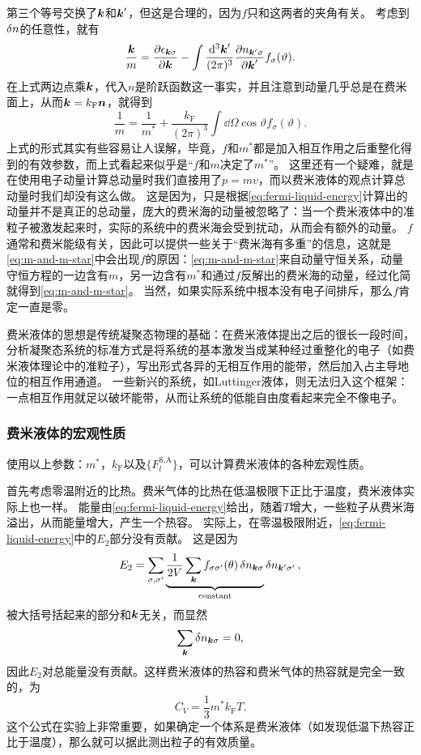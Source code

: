\documentclass[hyperref, UTF8, a4paper]{ctexart}
\begin{document}
第三个等号交换了$\vb*{k}$和$\vb*{k}'$，但这是合理的，因为$f$只和这两者的夹角有关。
考虑到$\var{n}$的任意性，就有
\[
    \frac{\vb*{k}}{m} = \pdv{\epsilon_{\vb*{k} \sigma}}{\vb*{k}} - \int \frac{\dd[3]{\vb*{k}'}}{(2\pi)^3} \pdv{n_{\vb*{k}' \sigma}}{\vb*{k}'} f_{\sigma}(\vartheta).
\]
在上式两边点乘$\vb*{k}$，代入$n$是阶跃函数这一事实，并且注意到动量几乎总是在费米面上，从而$\vb*{k} = k_\text{F} \vb*{n}$，就得到
\begin{equation}
    \frac{1}{m} = \frac{1}{m^*} + \frac{k_\text{F}}{(2\pi)^3} \int \dd{\Omega} \cos \vartheta f_\sigma(\vartheta).
    \label{eq:m-and-m-star}
\end{equation}
上式的形式其实有些容易让人误解，毕竟，$f$和$m^*$都是加入相互作用之后重整化得到的有效参数，而上式看起来似乎是“$f$和$m$决定了$m^*$”。
这里还有一个疑难，就是在使用电子动量计算总动量时我们直接用了$p=mv$，而以费米液体的观点计算总动量时我们却没有这么做。
这是因为，只是根据\eqref{eq:fermi-liquid-energy}计算出的动量并不是真正的总动量，庞大的费米海的动量被忽略了：当一个费米液体中的准粒子被激发起来时，实际的系统中的费米海会受到扰动，从而会有额外的动量。
$f$通常和费米能级有关，因此可以提供一些关于“费米海有多重”的信息，这就是\eqref{eq:m-and-m-star}中会出现$f$的原因：\eqref{eq:m-and-m-star}来自动量守恒关系，动量守恒方程的一边含有$m$，另一边含有$m^*$和通过$f$反解出的费米海的动量，经过化简就得到\eqref{eq:m-and-m-star}。
当然，如果实际系统中根本没有电子间排斥，那么$f$肯定一直是零。

费米液体的思想是传统凝聚态物理的基础：在费米液体提出之后的很长一段时间，分析凝聚态系统的标准方式是将系统的基本激发当成某种经过重整化的电子（如费米液体理论中的准粒子），写出形式各异的无相互作用的能带，然后加入占主导地位的相互作用通道。
一些新兴的系统，如Luttinger液体，则无法归入这个框架：一点相互作用就足以破坏能带，从而让系统的低能自由度看起来完全不像电子。

\subsubsection{费米液体的宏观性质}

使用以上参数：$m^*$，$k_\text{F}$以及$\{F_l^\text{S,A}\}$，可以计算费米液体的各种宏观性质。

首先考虑零温附近的比热。费米气体的比热在低温极限下正比于温度，费米液体实际上也一样。
能量由\eqref{eq:fermi-liquid-energy}给出，随着$T$增大，一些粒子从费米海溢出，从而能量增大，产生一个热容。
实际上，在零温极限附近，\eqref{eq:fermi-liquid-energy}中的$E_2$部分没有贡献。
这是因为
\[
    E_2 = \sum_{\sigma, \sigma'} \underbrace{\frac{1}{2V} \sum_{\vb*{k}} f_{\sigma \sigma'}(\theta) \var{n}_{\vb*{k} \sigma}}_{\text{constant}} \var{n}_{\vb*{k}' \sigma'},
\]
被大括号括起来的部分和$\vb*{k}$无关，而显然
\[
    \sum_{\vb*{k}} \var{n}_{\vb*{k} \sigma} = 0,
\]
因此$E_2$对总能量没有贡献。这样费米液体的热容和费米气体的热容就是完全一致的，为
\begin{equation}
    C_V = \frac{1}{3} m^* k_\text{F} T.
\end{equation}
这个公式在实验上非常重要，如果确定一个体系是费米液体（如发现低温下热容正比于温度），那么就可以据此测出粒子的有效质量。
\end{document}
